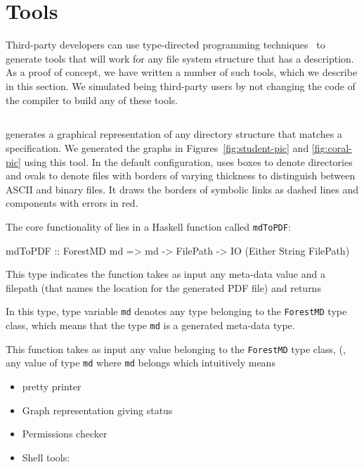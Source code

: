 \section{Tools}
\label{sec:tools}
Third-party developers can use type-directed programming techniques~\cite{??} to
generate tools that will work for any file system structure that has a
\forest{} description.  As a proof of concept, we have written a
number of such tools, which we describe in this section.  We simulated
being third-party users by not changing the code of the \forest{}
compiler to build any of these tools.

\subsection{\fg{}}
\fg{} generates a graphical representation of any directory structure that matches a 
\forest{} specification.  We generated the graphs in
Figures~\ref{fig:student-pic} and \ref{fig:coral-pic} using  
this tool.  In the default configuration, \fg{} uses boxes to denote
directories and ovals to denote files with borders of varying
thickness to distinguish between ASCII and binary files.  
It draws the borders of symbolic links as dashed lines and components
with errors in red.

The core functionality of \fg{} lies in a Haskell function
called \texttt{mdToPDF}:

\begin{code}
mdToPDF :: ForestMD md => 
     md -> FilePath -> IO (Either String FilePath)
\end{code}
This type indicates the function takes as input any \forest{}
meta-data value and a filepath (that names the location for the
generated PDF file) and returns 

In this type, type variable \texttt{md} denotes any type belonging to
the \texttt{ForestMD} type class, which means that the type
\texttt{md} is a generated \forest{} meta-data type. 

This function takes as input any value belonging to the
\texttt{ForestMD} type class, (\ie, any value of type \texttt{md}
where \texttt{md} belongs 
which intuitively means \texttt{}

\begin{itemize}
\item pretty printer
\item Graph representation giving status
\item Permissions checker
\item Shell tools: 
\end{itemize}
